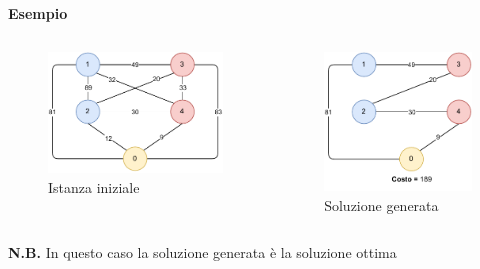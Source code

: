 \documentclass[9pt]{beamer}
\begin{document}
\begin{frame}[allowframebreaks]{\subsecname}
\textbf{Esempio}
\begin{columns}[T,onlytextwidth]
	\begin{figure}[h]
	\centering
	\includegraphics[height=0.4\textheight]
	{../images/graph-tsppd-with-two-customers}	
	\caption{Istanza iniziale}
	\end{figure}
	\begin{figure}[h]
	\centering
	\includegraphics[height=0.4\textheight]
	{../images/graph-greedy-request-order-solution-tsppd-with-two-customers}	
	\caption{Soluzione generata}
	\end{figure}
\end{columns}

\textbf{N.B.} In questo caso la soluzione generata è la soluzione ottima

\framebreak


\end{frame}
\end{document}
